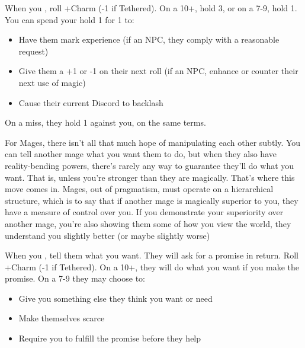 



\begin{multicols}{3}

  \begin{move}
    When you , roll
    +Charm (-1 if Tethered). On a 10+, hold 3, or on a 7-9, hold
    1. You can spend your hold 1 for 1 to:
    \begin{itemize}
      \setlength\itemsep{-.5em}
    \item Have them mark experience (if an NPC, they comply with a
      reasonable request)
    \item Give them a +1 or -1 on their next roll (if an NPC, enhance
      or counter their next use of magic)
    \item Cause their current Discord to backlash
    \end{itemize}
    On a miss, they hold 1 against you, on the same terms.
\begin{movedetail}
  For Mages, there isn't all that much hope of manipulating each other
  subtly. You can tell another mage what you want them to do, but when
  they also have reality-bending powers, there's rarely any way to
  guarantee they'll do what you want. That is, unless you're stronger
  than they are magically. That's where this move comes in. Mages, out
  of pragmatism, must operate on a hierarchical structure, which is to
  say that if another mage is magically superior to you, they have a
  measure of control over you. If you demonstrate your superiority
  over another mage, you're also showing them some of how you view the
  world, they understand you slightly better (or maybe slightly worse)
\end{movedetail}
  \end{move}

  \SEPARATOR

  \begin{move}
    When you , tell them what you want. They will
    ask for a promise in return. Roll +Charm (-1 if Tethered). On a
    10+, they will do what you want if you make the promise. On a 7-9
    they may choose to:
    \begin{itemize}
    \item Give you something else they think you want or need
    \item Make themselves scarce
    \item Require you to fulfill the promise before they help
    \end{itemize}
  \end{move}


\end{multicols}
